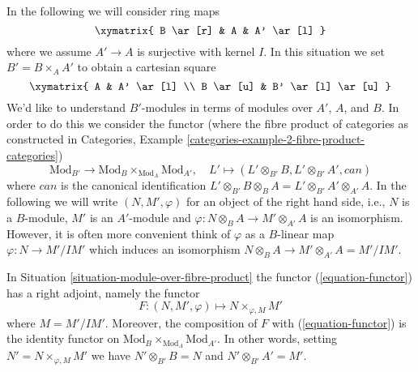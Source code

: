 \begin{situation}
\label{situation-module-over-fibre-product}
In the following we will consider ring maps
$$
\xymatrix{
B \ar[r] & A & A' \ar[l]
}
$$
where we assume $A' \to A$ is surjective with kernel $I$.
In this situation we set $B' = B \times_A A'$ to
obtain a cartesian square
$$
\xymatrix{
A & A' \ar[l] \\
B \ar[u] & B' \ar[l] \ar[u]
}
$$
We'd like to understand $B'$-modules in terms of modules over $A'$, $A$,
and $B$. In order to do this we consider the functor (where the
fibre product of categories as constructed in
Categories, Example \ref{categories-example-2-fibre-product-categories})
\begin{equation}
\label{equation-functor}
\text{Mod}_{B'} \longrightarrow
\text{Mod}_B \times_{\text{Mod}_A} \text{Mod}_{A'},\quad
L' \longmapsto (L' \otimes_{B'} B, L' \otimes_{B'} A', can)
\end{equation}
where $can$ is the canonical identification
$L' \otimes_{B'} B \otimes_B A = L' \otimes_{B'} A' \otimes_{A'} A$.
In the following we will write $(N, M', \varphi)$ for an object
of the right hand side, i.e., $N$ is a $B$-module, $M'$ is an $A'$-module
and $\varphi : N \otimes_B A \to M' \otimes_{A'} A$ is an isomorphism.
However, it is often more convenient think of $\varphi$ as a $B$-linear
map $\varphi : N \to M'/IM'$ which induces an isomorphism
$N \otimes_B A \to M' \otimes_{A'} A = M'/IM'$.
\end{situation}

\begin{lemma}
\label{lemma-module-over-fibre-product}
In Situation \ref{situation-module-over-fibre-product}
the functor (\ref{equation-functor}) has a right adjoint, namely
the functor
$$
F : (N, M', \varphi) \longmapsto N \times_{\varphi, M} M'
$$
where $M = M'/IM'$. Moreover, the composition of $F$ with
(\ref{equation-functor}) is the identity functor on
$\text{Mod}_B \times_{\text{Mod}_A} \text{Mod}_{A'}$. In other words,
setting $N' = N \times_{\varphi, M} M'$ we have
$N' \otimes_{B'} B = N$ and $N' \otimes_{B'} A' = M'$.
\end{lemma}

